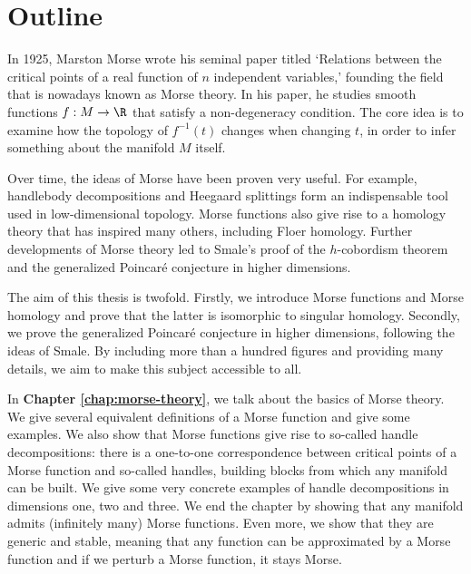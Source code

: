 \chapter*{Outline}
\label{ch:summary}

\vspace*{-1cm}
In 1925, Marston Morse wrote his seminal paper titled `Relations between the critical points of a real function of $n$ independent variables,' founding the field that is nowadays known as Morse theory.
In his paper, he studies smooth functions $f:M \to  \R$ that satisfy a non-degeneracy condition.
The core idea is to examine how the topology of $f^{-1}(t)$ changes when changing $t$, in order to infer something about the manifold $M$ itself.

Over time, the ideas of Morse have been proven very useful.
For example, handlebody decompositions and Heegaard splittings form an indispensable tool used in low-dimensional topology.
Morse functions also give rise to a homology theory that has inspired many others, including Floer homology.
Further developments of Morse theory led to Smale's proof of the $h$-cobordism theorem and the generalized Poincaré conjecture in higher dimensions.

The aim of this thesis is twofold.
Firstly, we introduce Morse functions and Morse homology and prove that the latter is isomorphic to singular homology.
Secondly, we prove the generalized Poincaré conjecture in higher dimensions, following the ideas of Smale.
By including more than a hundred figures and providing many details, we aim to make this subject accessible to all.



\bigskip
In \textbf{Chapter \ref{chap:morse-theory}}, we talk about the basics of Morse theory.
We give several equivalent definitions of a Morse function and give some examples.
We also show that Morse functions give rise to so-called handle decompositions: there is a one-to-one correspondence between critical points of a Morse function and so-called handles, building blocks from which any manifold can be built.
We give some very concrete examples of handle decompositions in dimensions one, two and three.
We end the chapter by showing that any manifold admits (infinitely many) Morse functions.
Even more, we show that they are generic and stable, meaning that any function can be approximated by a Morse function and if we perturb a Morse function, it stays Morse.


